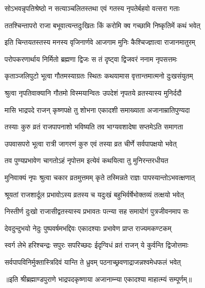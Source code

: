 \twolineshloka
{सोऽभवन्नृपतिश्रेष्ठो न सत्याञ्चलितस्तथा}
{एवं गतस्य नृपतेर्बहवो वत्सरा गताः} %

\twolineshloka
{ततश्चिन्तापरो राजा बभूवात्यन्तदुःखितः}
{किं करोमि क्व गच्छामि निष्कृतिमें कथं भवेत्} %

\twolineshloka
{इति चिन्तयतस्तस्य मनस्य वृजिनार्णवे}
{आजगाम मुनिः कैश्चिज्ज्ञात्वा राजानमातुरम्} %

\twolineshloka
{परोपकरणार्थाय निर्मितो ब्रह्मणा द्विजः}
{स तं दृष्ट्वा द्विजवरं ननाम नृपसत्तमः} %

\twolineshloka
{कृताञ्जलिपुटो भूत्वा गौतमस्याग्रतः स्थितः}
{कथयामास वृत्तान्तमात्मनो दुःखसंयुतम्} %

\twolineshloka
{श्रुत्वा नृपतिवाक्यानि गौतमो विस्मयान्वितः}
{उपदेशं नृपतये व्रतस्यास्य मुनिर्ददौ} %

\twolineshloka
{मासि भाद्रपदे राजन् कृष्णपक्षे तु शोभना}
{एकादशी समाख्याता अजानाम्रातिपुण्यदा} %

\twolineshloka
{तस्याः कुरु व्रतं राजपापनाशो भविष्यति}
{तव भाग्यवशादेषा सप्तमेऽति समागता} %

\twolineshloka
{उपवासपरो भूत्वा रात्री जागरणं कुरु}
{एवं तस्या व्रत चीर्णे सर्वपापक्षयो भवेत्} %

\twolineshloka
{तव पुण्यप्रभावेण चागतोऽहं नृपोत्तम}
{इत्येवं कथयित्वा तु मुनिरन्तरधीयत} %

\twolineshloka
{मुनिवाक्यं नृपः श्रुत्वा चकार व्रतमुत्तमम्}
{कृते तस्मिन्नते राज्ञः पापस्यान्तोऽभवत्क्षणात्} %

\twolineshloka
{श्रूयतां राजशार्दूल प्रभावोऽस्य व्रतस्य च}
{यदुःखं बहुभिर्वर्षेभोक्तव्यं तत्क्षयो भवेत्} %

\twolineshloka
{निस्तीर्ण दुःखो राजासीद्वतस्यास्य प्रभावतः}
{पत्न्या सह समायोगं पुत्रजीवनमाप सः} %

\twolineshloka
{देवदुन्दुभयो नेदुः पुष्पवर्षमभद्दिवः}
{एकादश्याः प्रभावेण प्राप्त राज्यमकण्टकम्} %

\twolineshloka
{स्वर्ग लेभे हरिश्चन्द्रः सपुरः सपरिच्छदः}
{ईदृग्विधं व्रतं राजन् ये कुर्वन्ति द्विजोत्तमाः} %

\twolineshloka
{सर्वपापविनिर्मुक्तास्त्रिदिवं यान्ति ते ध्रुवम्}
{पठनाच्छ्रवणाद्राजन्नश्वमेधफलं भवेत्} %

॥इति श्रीब्रह्माण्डपुराणे भाद्रपदकृष्णाया अजानाम्न्या एकादश्या माहात्म्यं सम्पूर्णम्॥


\hyperref[sec:ekadashi_mahatmyam_vrata_raja]{\closesub}
\clearpage

\label{sec:vrata-raja-bhadrapada-shukla-padma}

